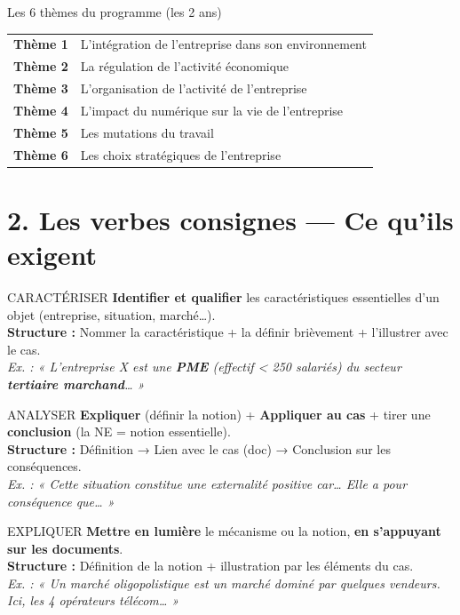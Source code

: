 \documentclass[11pt,a4paper]{article}
\begin{document}
\vspace{4pt}
\begin{methbox}{Les 6 thèmes du programme (les 2 ans)}
\begin{tabular}{cl}
\textbf{Thème 1} & L'intégration de l'entreprise dans son environnement \\
\textbf{Thème 2} & La régulation de l'activité économique \\
\textbf{Thème 3} & L'organisation de l'activité de l'entreprise \\
\textbf{Thème 4} & L'impact du numérique sur la vie de l'entreprise \\
\textbf{Thème 5} & Les mutations du travail \\
\textbf{Thème 6} & Les choix stratégiques de l'entreprise \\
\end{tabular}
\end{methbox}

\section*{\textcolor{mainColor}{2. Les verbes consignes — Ce qu'ils exigent}}

\begin{verbebox}{CARACTÉRISER}
\textbf{Identifier et qualifier} les caractéristiques essentielles d'un objet (entreprise, situation, marché…).\\
\textbf{Structure :} Nommer la caractéristique + la définir brièvement + l'illustrer avec le cas.\\
\textit{Ex. : « L'entreprise X est une \textbf{PME} (effectif < 250 salariés) du secteur \textbf{tertiaire marchand}… »}
\end{verbebox}

\vspace{4pt}
\begin{verbebox}{ANALYSER}
\textbf{Expliquer} (définir la notion) + \textbf{Appliquer au cas} + tirer une \textbf{conclusion} (la NE = notion essentielle).\\
\textbf{Structure :} Définition → Lien avec le cas (doc) → Conclusion sur les conséquences.\\
\textit{Ex. : « Cette situation constitue une externalité positive car… Elle a pour conséquence que… »}
\end{verbebox}

\vspace{4pt}
\begin{verbebox}{EXPLIQUER}
\textbf{Mettre en lumière} le mécanisme ou la notion, \textbf{en s'appuyant sur les documents}.\\
\textbf{Structure :} Définition de la notion + illustration par les éléments du cas.\\
\textit{Ex. : « Un marché oligopolistique est un marché dominé par quelques vendeurs. Ici, les 4 opérateurs télécom… »}
\end{verbebox}
\end{document}
